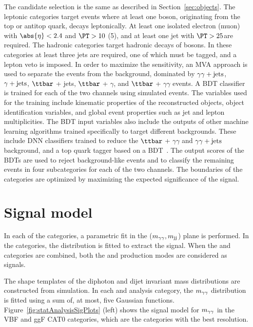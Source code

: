 \documentclass[11pt,twoside,a4paper,cmspaper,final,collab]{cms-tdr}
\begin{document}
The \Hgg candidate selection is the same as described in Section~\ref{sec:objects}. 
The \ttH leptonic categories target \ttH events where at least one \PW boson, originating from the top or antitop quark, decays leptonically. At least one isolated electron (muon) with $\abs{\eta} <2.4$ and $\PT>10$ (5)\GeV, and at least one jet with $\PT>25$\GeV are required. The \ttH hadronic categories target hadronic decays of \PW bosons. In these categories at least three jets are required, one of which must be {\cPqb} tagged, and a lepton veto is imposed. In order to maximize the sensitivity, an MVA approach is used to separate the \ttH events from the background, dominated by $\gamma\gamma+\text{jets}$, $\gamma+\text{jets}$, $\ttbar$ + jets, $\ttbar$ + $\gamma$, and $\ttbar$ + $\gamma\gamma$ events. A BDT classifier is trained for each of the two channels using simulated events.
The variables used for the training include kinematic properties of the reconstructed objects, object identification variables, and global event properties such as jet and lepton multiplicities. The BDT input variables also include the outputs of other machine learning algorithms trained specifically to target different backgrounds.
These include DNN classifiers trained to reduce the $\ttbar$ + $\gamma\gamma$ and $\gamma\gamma+\text{jets}$ background, and a top quark tagger based on a BDT~\cite{Sirunyan:2017wif}.
 The output scores of the BDTs are used to reject background-like events and to classify the remaining  events in four subcategories for each of the two channels. The boundaries of the categories are optimized by maximizing the expected significance of the \ttH signal.



\section{Signal model}
\label{sec:signal}

In each of the \HH categories, a parametric fit in the ($m_{\gamma\gamma},m_\text{jj}$) plane is performed. In the \ttH categories, the \Mgg distribution is fitted to extract the signal. When the \HH and \ttH categories are combined, both the \HH and \ttH production modes are considered as signals.

The shape templates of the diphoton and dijet invariant mass distributions are constructed from simulation. 
In each \HH and \ttH analysis category, the $m_{\gamma\gamma}$ distribution is fitted using a sum
of, at most, five Gaussian functions.
Figure~\ref{fig:statAnalysisSigPlots} (left) shows the signal model for $m_{\gamma\gamma}$ in the VBF and ggF CAT0 categories, which are the categories with the best resolution.
\end{document}
